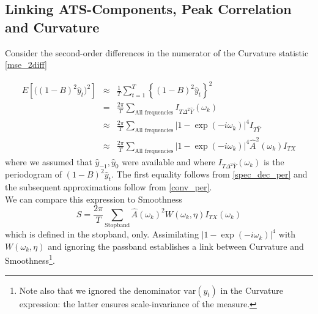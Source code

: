\documentclass[a4paper]{book}
\begin{document}
\subsection{Linking ATS-Components, Peak Correlation and Curvature}


Consider the second-order differences in the numerator of the Curvature statistic \ref{mse_2diff}

\begin{eqnarray*}
E\left[\Big((1-B)^2 \widehat{y}_t\Big)^2\right]&\approx&\frac{1}{T}\sum_{t=1}^T \left\{(1-B)^2 \widehat{y}_t\right\}^2\\
&=&\frac{2\pi}{T}\sum_{\textrm{All~frequencies}}I_{T\Delta^2\hat{Y}}(\omega_k)\\
&\approx&\frac{2\pi}{T}\sum_{\textrm{All~frequencies}}|1-\exp(-i\omega_k)|^4I_{T\hat{Y}}\\
&\approx&\frac{2\pi}{T}\sum_{\textrm{All~frequencies}}|1-\exp(-i\omega_k)|^4\hat{A}^2(\omega_k)I_{TX}
\end{eqnarray*}
where we assumed that $\hat{y}_{-1},\hat{y}_0$ were available and where $I_{T\Delta^2\hat{Y}}(\omega_k)$ is the periodogram of $(1-B)^2 \widehat{y}_t$. The first equality follows from \ref{spec_dec_per} and the subsequent approximations follow from \ref{conv_per}.\\
We can compare this expression to  Smoothness
\[S=\frac{2\pi}{ T} \sum_{\textrm{Stopband}} \hat{A}(\omega_k)^2 W(\omega_k,\eta) I_{TX}(\omega_k)\]
which is defined in the stopband, only. Assimilating $|1-\exp(-i\omega_k)|^4$ with $W(\omega_k,\eta)$ and ignoring the passband establishes a link between Curvature and Smoothness\footnote{Note also that we ignored the denominator $\textrm{var}(\widehat{y_t})$ in the Curvature expression: the latter ensures scale-invariance of the measure.}.\\
\end{document}
